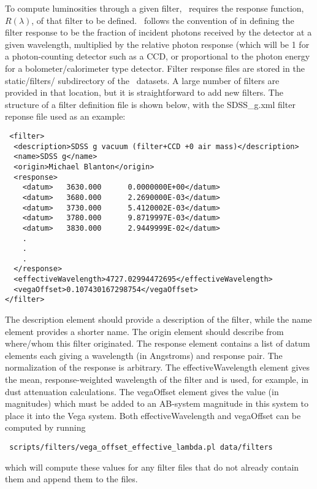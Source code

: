 To compute luminosities through a given filter, \glc\ requires the response function, $R(\lambda)$, of that filter to be defined. \glc\ follows the convention of \cite{hogg_k_2002} in defining the filter response to be the fraction of incident photons received by the detector at a given wavelength, multiplied by the relative photon response (which will be 1 for a photon-counting detector such as a CCD, or proportional to the photon energy for a bolometer/calorimeter type detector. Filter response files are stored in the {\normalfont \ttfamily static/filters/} subdirectory of the \glc\ datasets. A large number of filters are provided in that location, but it is straightforward to add new filters. The structure of a filter definition file is shown below, with the {\normalfont \ttfamily SDSS\_g.xml} filter reponse file used as an example:
\begin{verbatim}
 <filter>
  <description>SDSS g vacuum (filter+CCD +0 air mass)</description>
  <name>SDSS g</name>
  <origin>Michael Blanton</origin>
  <response>
    <datum>   3630.000      0.0000000E+00</datum>
    <datum>   3680.000      2.2690000E-03</datum>
    <datum>   3730.000      5.4120002E-03</datum>
    <datum>   3780.000      9.8719997E-03</datum>
    <datum>   3830.000      2.9449999E-02</datum>
    .
    .
    . 
  </response>
  <effectiveWavelength>4727.02994472695</effectiveWavelength>
  <vegaOffset>0.107430167298754</vegaOffset>
</filter>
\end{verbatim}
The {\normalfont \ttfamily description} element should provide a description of the filter, while the {\normalfont \ttfamily name} element provides a shorter name. The {\normalfont \ttfamily origin} element should describe from where/whom this filter originated. The {\normalfont \ttfamily response} element contains a list of {\normalfont \ttfamily datum} elements each giving a wavelength (in Angstroms) and response pair. The normalization of the response is arbitrary. The {\normalfont \ttfamily effectiveWavelength} element gives the mean, response-weighted wavelength of the filter and is used, for example, in dust attenuation calculations. The {\normalfont \ttfamily vegaOffset} element gives the value (in magnitudes) which must be added to an AB-system magnitude in this system to place it into the Vega system. Both {\normalfont \ttfamily effectiveWavelength} and {\normalfont \ttfamily vegaOffset} can be computed by running
\begin{verbatim}
 scripts/filters/vega_offset_effective_lambda.pl data/filters
\end{verbatim}
which will compute these values for any filter files that do not already contain them and append them to the files.
